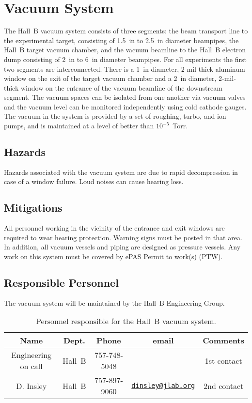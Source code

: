 \section{Vacuum System}

The Hall~B vacuum system consists of three segments: the beam transport line to the 
experimental target, consisting of 1.5~in to 2.5~in diameter beampipes, the Hall~B 
target vacuum chamber, and the vacuum beamline to the Hall~B electron dump consisting of 
2~in to 6~in diameter beampipes. For all experiments the first two segments are 
interconnected. There is a 1~in diameter, 2-mil-thick aluminum window on the exit of the 
target vacuum chamber and a 2~in diameter, 2-mil-thick window on the entrance of the 
vacuum beamline of the downstream segment. The vacuum spaces can be 
isolated from one another via vacuum valves and the vacuum level can be monitored 
independently using cold cathode gauges. The vacuum in the system is provided by a set of 
roughing, turbo, and ion pumps, and is maintained at a level of better than 
$10^{-5}$~Torr. 

\subsection{Hazards} 

Hazards associated with the vacuum system are due to rapid decompression in case of a window 
failure. Loud noises can cause hearing loss. 

\subsection{Mitigations}

All personnel working in the vicinity of the entrance and exit windows are required to wear 
hearing protection. Warning signs must be posted in that area. In addition, all vacuum vessels 
and piping are designed as pressure vessels.  Any work on this system must be covered by ePAS
Permit to work(s) (PTW).

\subsection{Responsible Personnel}

The vacuum system will be maintained by the Hall~B Engineering Group.  

\begin{table}[!htb]
\centering
\begin{tabular}{|c|c|c|c|c|} \hline
Name&Dept.&Phone&email&Comments \\ \hline
Engineering on call & Hall~B& 757-748-5048&& 1st contact  \\ \hline
D. Insley & Hall~B  &757-897-9060&\href{mailto:dinsley@jlab.org}{\nolinkurl{dinsley@jlab.org}}  &2nd contact \\ \hline
 \end{tabular}
\caption{Personnel responsible for the Hall~B vacuum system.} 
\label{tb:vacuum}
\end{table}

